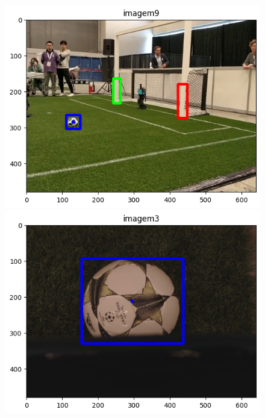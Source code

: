 \documentclass[a4paper,12pt]{article}
\begin{document}
\begin{figure}[htbp]
\begin{minipage}[b]{0.3\textwidth}
    \end{minipage}
    \hfill
    \begin{minipage}[b]{0.3\textwidth}
        \centering
        \includegraphics[width=\textwidth]{imagem3.png}
 
    \end{minipage}
    
    \vspace{0.5cm}
    
    \begin{minipage}[b]{0.45\textwidth}
        \centering
        \includegraphics[width=\textwidth]{imagem4.png}


\end{minipage}
\end{figure}
\end{document}
